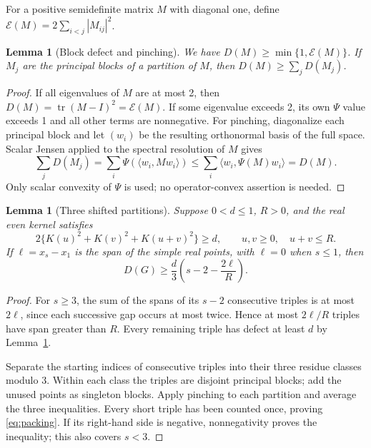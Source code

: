 ﻿\documentclass[11pt]{article}
\newtheorem{lemma}[theorem]{Lemma}
\theoremstyle{remark}
\DeclareMathOperator{\tr}{tr}
\newcommand{\cE}{\mathcal E}
\begin{document}
For a positive semidefinite matrix $M$ with diagonal one, define
$\cE(M)=2\sum_{i<j}|M_{ij}|^2$.

\begin{lemma}[Block defect and pinching]\label{lem:pinch}
We have $D(M)\ge\min\{1,\cE(M)\}$. If $M_j$ are the principal blocks
of a partition of $M$, then $D(M)\ge\sum_jD(M_j)$.
\end{lemma}
\begin{proof}
If all eigenvalues of $M$ are at most 2, then
$D(M)=\tr(M-I)^2=\cE(M)$. If some eigenvalue exceeds 2, its own
$\Psi$ value exceeds 1 and all other terms are nonnegative.
For pinching, diagonalize each principal block and let $(w_i)$ be the
resulting orthonormal basis of the full space. Scalar Jensen applied to
the spectral resolution of $M$ gives
\[
 \sum_jD(M_j)=\sum_i\Psi(\langle w_i,Mw_i\rangle)
 \le\sum_i\langle w_i,\Psi(M)w_i\rangle=D(M).
\]
Only scalar convexity of $\Psi$ is used; no operator-convex assertion is
needed.
\end{proof}

\begin{lemma}[Three shifted partitions]\label{lem:triples}
Suppose $0<d\le1$, $R>0$, and the real even kernel satisfies
\begin{equation}\label{eq:triangle}
 2\{K(u)^2+K(v)^2+K(u+v)^2\}\ge d,
 \qquad u,v\ge0,\quad u+v\le R.
\end{equation}
If $\ell=x_s-x_1$ is the span of the simple real points, with $\ell=0$
when $s\le1$, then
\begin{equation}\label{eq:packing}
 D(G)\ge\frac d3\left(s-2-\frac{2\ell}{R}\right).
\end{equation}
\end{lemma}
\begin{proof}
For $s\ge3$, the sum of the spans of its $s-2$ consecutive triples is
at most $2\ell$, since each successive gap occurs at most twice. Hence
at most $2\ell/R$ triples have span greater than $R$. Every remaining
triple has defect at least $d$ by Lemma~\ref{lem:pinch}.

Separate the starting indices of consecutive triples into their three
residue classes modulo 3. Within each class the triples are disjoint
principal blocks; add the unused points as singleton blocks. Apply
pinching to each partition and average the three inequalities. Every
short triple has been counted once, proving \eqref{eq:packing}. If its
right-hand side is negative, nonnegativity proves the inequality; this
also covers $s<3$.
\end{proof}
\end{document}
